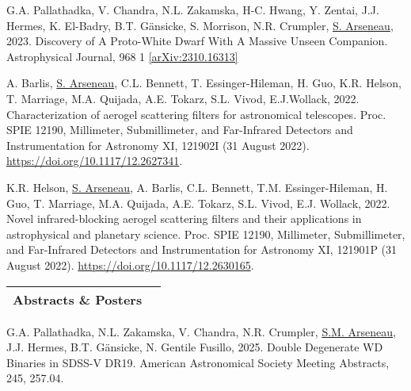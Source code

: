 \documentclass[letterpaper,11pt]{article}
\newenvironment{packed_enumerate}[1][]{
\begin{etaremune}[#1]
  \setlength{\itemsep}{3.7pt}
  \setlength{\parskip}{0pt}
  \setlength{\parsep}{0pt}}{\end{etaremune}
}
\begin{document}
\begin{packed_enumerate}
\item G.A. Pallathadka, V. Chandra, N.L. Zakamska, H-C. Hwang, Y. Zentai, J.J. Hermes, K. El-Badry, B.T. G\"ansicke, S. Morrison, N.R. Crumpler, \underline{S. Arseneau}, 2023. Discovery of A Proto-White Dwarf With A Massive Unseen Companion. Astrophysical Journal, 968 1 \href{https://doi.org/10.48550/arXiv.2310.16313}{[arXiv:2310.16313]}

\item A. Barlis, \underline{S. Arseneau}, C.L. Bennett, T. Essinger-Hileman, H. Guo, K.R. Helson, T. Marriage, M.A. Quijada, A.E. Tokarz, S.L. Vivod, E.J.Wollack, 2022. Characterization of aerogel scattering filters for astronomical telescopes. Proc. SPIE 12190, Millimeter, Submillimeter, and Far-Infrared Detectors and Instrumentation for Astronomy XI, 121902I (31 August 2022). \href{https://doi.org/10.1117/12.2627341}{https://doi.org/10.1117/12.2627341}.

\item K.R. Helson, \underline{S. Arseneau}, A. Barlis, C.L. Bennett, T.M. Essinger-Hileman, H. Guo, T. Marriage, M.A. Quijada, A.E. Tokarz, S.L. Vivod, E.J. Wollack, 2022. Novel infrared-blocking aerogel scattering filters and their applications in astrophysical and planetary science. Proc. SPIE 12190, Millimeter, Submillimeter, and Far-Infrared Detectors and Instrumentation for Astronomy XI, 121901P (31 August 2022). \href{https://doi.org/10.1117/12.2630165}{https://doi.org/10.1117/12.2630165}.

\end{packed_enumerate}
\vspace{2.0mm}

\noindent
\begin{tabular*}{\textwidth}{l@{\extracolsep{\fill}}r}
\large {\sc \Large{Abstracts \& Posters}}  \\
\hline
\end{tabular*}\vspace{3.5mm}

\noindent

\begin{packed_enumerate}

\item G.A. Pallathadka, N.L. Zakamska, V. Chandra, N.R. Crumpler, \underline{S.M. Arseneau}, J.J. Hermes, B.T. G\"ansicke, N. Gentile Fusillo, 2025. Double Degenerate WD Binaries in SDSS-V DR19. American Astronomical Society Meeting Abstracts, 245, 257.04.

\end{packed_enumerate}
\vspace{2.0mm}
\end{document}
